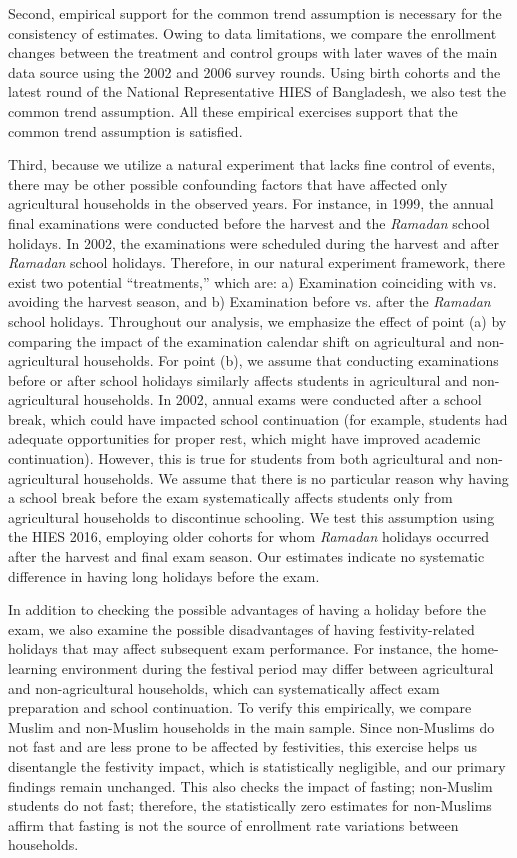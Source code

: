 \documentclass[12pt,letterpaper]{article}
\newcommand{\0}{\ensuremath{\mbox{\boldmath $0$}}}
\begin{document}
Second, empirical support for the common trend assumption is necessary for the consistency of estimates. Owing to data limitations, we compare the enrollment changes between the treatment and control groups with later waves of the main data source using the 2002 and 2006 survey rounds. Using birth cohorts and the latest round of the National Representative HIES of Bangladesh, we also test the common trend assumption. All these empirical exercises support that the common trend assumption is satisfied.  
 
Third, because we utilize a natural experiment that lacks fine control of events, there may be other possible confounding factors that have affected only agricultural households in the observed years. For instance, in 1999, the annual final examinations were conducted before the harvest and the \textit{Ramadan} school holidays. In 2002, the examinations were scheduled during the harvest and after \textit{Ramadan} school holidays. Therefore, in our natural experiment framework, there exist two potential ``treatments,'' which are: a) Examination coinciding with vs. avoiding the harvest season, and b) Examination before vs. after the \textit{Ramadan} school holidays. Throughout our analysis, we emphasize the effect of point (a) by comparing the impact of the examination calendar shift on agricultural and non-agricultural households. For point (b), we assume that conducting examinations before or after school holidays similarly affects students in agricultural and non-agricultural households. In 2002, annual exams were conducted after a school break, which could have impacted school continuation (for example, students had adequate opportunities for proper rest, which might have improved academic continuation). However, this is true for students from both agricultural and non-agricultural households. We assume that there is no particular reason why having a school break before the exam systematically affects students only from agricultural households to discontinue schooling. We test this assumption using the HIES 2016, employing older cohorts for whom \textit{Ramadan} holidays occurred after the harvest and final exam season. Our estimates indicate no systematic difference in having long holidays before the exam. 

In addition to checking the possible advantages of having a holiday before the exam, we also examine the possible disadvantages of having festivity-related holidays that may affect subsequent exam performance. For instance, the home-learning environment during the festival period may differ between agricultural and non-agricultural households, which can systematically affect exam preparation and school continuation. To verify this empirically, we compare Muslim and non-Muslim households in the main sample. Since non-Muslims do not fast and are less prone to be affected by festivities, this exercise helps us disentangle the festivity impact, which is statistically negligible, and our primary findings remain unchanged. This also checks the impact of fasting; non-Muslim students do not fast; therefore, the statistically zero estimates for non-Muslims affirm that fasting is not the source of enrollment rate variations between households. 
\end{document}
